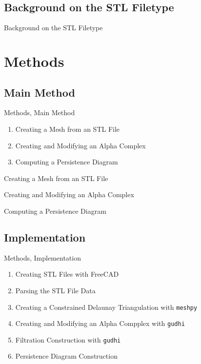 \documentclass[xcolor=dvipsnames]{beamer}
\begin{document}
\subsection{Background on the STL Filetype}
\begin{frame}{Background on the STL Filetype}

\end{frame}

\section{Methods}
\subsection{Main Method}
\begin{frame}{Methods, Main Method}
\begin{enumerate}
\item Creating a Mesh from an STL File
\item Creating and Modifying an Alpha Complex
\item Computing a Persistence Diagram
\end{enumerate}
\end{frame}

\begin{frame}{Creating a Mesh from an STL File}

\end{frame}

\begin{frame}{Creating and Modifying an Alpha Complex}

\end{frame}

\begin{frame}{Computing a Persistence Diagram}

\end{frame}

\subsection{Implementation}
\begin{frame}[fragile]{Methods, Implementation}
\begin{enumerate}
\item Creating STL Files with FreeCAD
\item Parsing the STL File Data
\item Creating a Constrained Delaunay Triangulation with \verb"meshpy"
\item Creating and Modifying an Alpha Compplex with \verb"gudhi"
\item Filtration Construction with \verb"gudhi"
\item Persistence Diagram Construction
\end{enumerate}
\end{frame}
\end{document}
